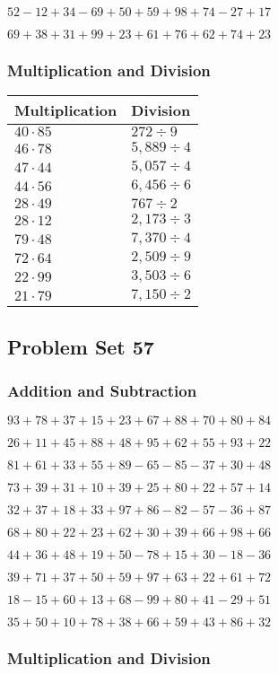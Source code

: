 \(52-12+34-69+50+59+98+74-27+17\)

\(69+38+31+99+23+61+76+62+74+23\)

\hypertarget{multiplication-and-division-96}{%
\subsubsection{Multiplication and
Division}\label{multiplication-and-division-96}}

\begin{longtable}[]{@{}ll@{}}
\toprule
Multiplication & Division\tabularnewline
\midrule
\endhead
\(40\cdot85\) & \(272 ÷9\)\tabularnewline
\(46\cdot78\) & \(5,889÷4\)\tabularnewline
\(47\cdot44\) & \(5,057÷4\)\tabularnewline
\(44\cdot56\) & \(6,456÷6\)\tabularnewline
\(28\cdot49\) & \(767÷2\)\tabularnewline
\(28\cdot12\) & \(2,173÷3\)\tabularnewline
\(79\cdot48\) & \(7,370÷4\)\tabularnewline
\(72\cdot64\) & \(2,509÷9\)\tabularnewline
\(22\cdot99\) & \(3,503÷6\)\tabularnewline
\(21\cdot79\) & \(7,150÷2\)\tabularnewline
\bottomrule
\end{longtable}

\hypertarget{problem-set-57}{%
\subsection{Problem Set 57}\label{problem-set-57}}

\hypertarget{addition-and-subtraction-97}{%
\subsubsection{Addition and
Subtraction}\label{addition-and-subtraction-97}}

\(93+78+37+15+23+67+88+70+80+ 84\)

\(26+11+45+88+48+95+62+55+93+22\)

\(81+61+33+55+89-65-85-37+30+48\)

\(73+39+31+10+39+25+80+22+57+14\)

\(32+37+18+33+97+86-82-57-36+87\)

\(68+80+22+23+62+30+39+66+98+66\)

\(44+36+48+19+50-78+15+30-18-36\)

\(39+71+37+50+59+97+63+22+61+72\)

\(18-15+60+13+68-99+80+41-29+51\)

\(35+50+10+78+38+66+59+43+86+32\)

\hypertarget{multiplication-and-division-97}{%
\subsubsection{Multiplication and
Division}\label{multiplication-and-division-97}}

